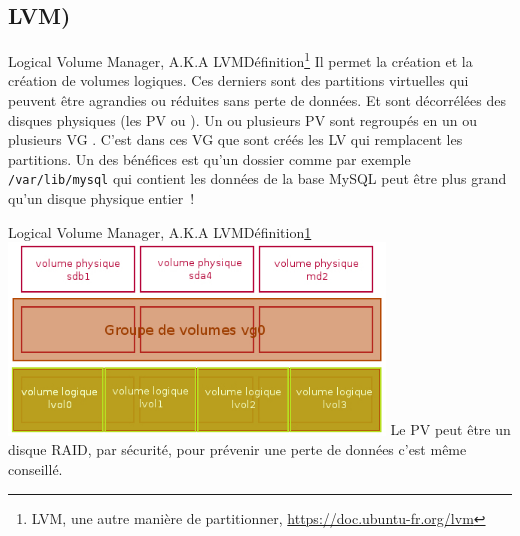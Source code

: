 \documentclass{beamer}
\begin{document}
    \subsection{LVM)}\label{subsec:lvm}

    \begin{frame}{Logical Volume Manager, A.K.A LVM}{Définition\footnote{\label{lvm}LVM, une autre manière de partitionner, \url{https://doc.ubuntu-fr.org/lvm}}}
        Il permet la création et la création de volumes logiques.
        Ces derniers sont des partitions virtuelles qui peuvent être agrandies ou réduites sans perte de données.
        Et sont décorrélées des disques physiques (les PV ou ).
        \bigbreak
        Un ou plusieurs PV sont regroupés en un ou plusieurs VG .
        \bigbreak
        C'est dans ces VG que sont créés les LV  qui remplacent les partitions.
        \bigbreak
        Un des bénéfices est qu'un dossier comme par exemple \lstinline{/var/lib/mysql} qui contient les données de la base MySQL peut être plus grand qu'un disque physique entier~!
    \end{frame}

    \begin{frame}{Logical Volume Manager, A.K.A LVM}{Définition\cref{lvm}}
        \centering
        \includegraphics[width=10cm]{image/lvm}
        \flushleft
        Le PV peut être un disque RAID, par sécurité, pour prévenir une perte de données c'est même conseillé.
    \end{frame}
\end{document}
